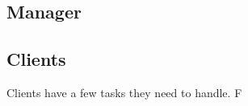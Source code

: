 \documentclass[a4paper,10pt,twocolumn]{article}
\begin{document}
\subsection{Manager}


\subsection{Clients}
Clients have a few tasks they need to handle. F
\end{document}
